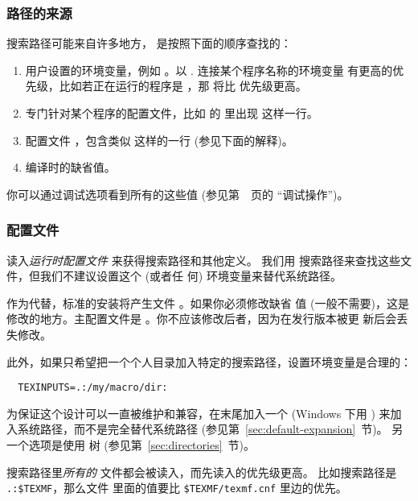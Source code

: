 \documentclass{article}
\begin{document}
\subsubsection{路径的来源}
\label{sec:path-sources}

搜索路径可能来自许多地方，\KPS{} 是按照下面的顺序查找的：

\begin{enumerate}
  \item
        用户设置的环境变量，例如 \@。以 . 连接某个程序名称的环境变量
        有更高的优先级，比如若正在运行的程序是 ，那 
        将比  优先级更高。
  \item
        专门针对某个程序的配置文件，比如  的  里出现
         这样一行。
  \item   \KPS{} 配置文件 ，包含类似
         这样的一行 (参见下面的解释)。
  \item 编译时的缺省值。
\end{enumerate}
\noindent 你可以通过调试选项看到所有的这些值 (参见第~\pageref{sec:debugging}~页的
``调试操作'')。

\subsubsection{配置文件}

\KPS{} 读入\emph{运行时配置文件}  来获得搜索路径和其他定义。
我们用  搜索路径来查找这些文件，但我们不建议设置这个 (或者任
何) 环境变量来替代系统路径。

作为代替，标准的安装将产生文件 。如果你必须修改缺省
值 (一般不需要)，这是修改的地方。主配置文件是
。你不应该修改后者，因为在发行版本被更
新后会丢失修改。

此外，如果只希望把一个个人目录加入特定的搜索路径，设置环境变量是合理的：
\begin{verbatim}
  TEXINPUTS=.:/my/macro/dir:
\end{verbatim}
为保证这个设计可以一直被维护和兼容，在末尾加入一个 \samp{:} (Windows 下用 \samp{;})
来加入系统路径，而不是完全替代系统路径 (参见第~\ref{sec:default-expansion}~节)。
另一个选项是使用  树 (参见第~\ref{sec:directories}~节)。

搜索路径里\emph{所有的}  文件都会被读入，而先读入的优先级更高。
比如搜索路径是 \verb|.:$TEXMF|，那么文件  里面的值要比
\verb|$TEXMF/texmf.cnf| 里边的优先。
\end{document}
